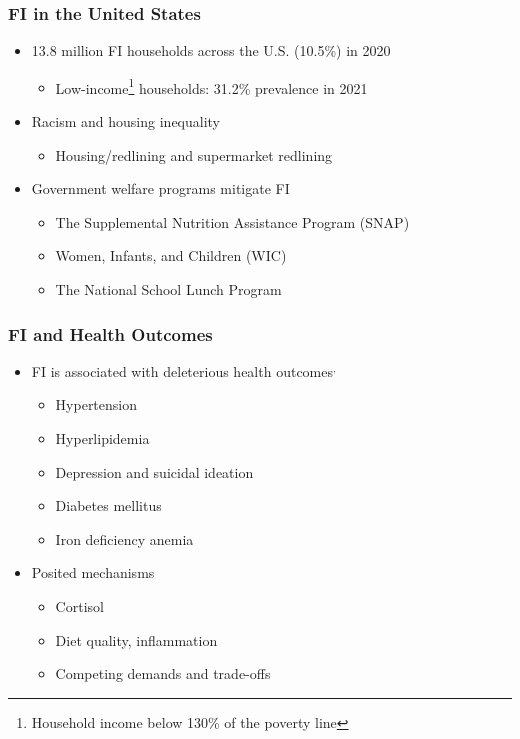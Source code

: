 \documentclass{beamer}
\begin{document}
\begin{frame}
	\frametitle{FI in the United States}
	\begin{itemize}
		\item 13.8 million FI households  across the U.S. (10.5\%) in 2020
		\begin{itemize}
			\item Low-income\footnote{Household income below 130\% of the poverty line}  households: 31.2\% prevalence in 2021
		\end{itemize}
		\item Racism and housing inequality
		\begin{itemize}
			\item Housing/redlining and supermarket redlining
		\end{itemize}       
		\item Government welfare programs mitigate FI     \begin{itemize}
			\item The Supplemental Nutrition Assistance Program (SNAP)
			\item Women, Infants, and Children (WIC)
			\item The National School Lunch Program
		\end{itemize}
	\end{itemize}
\end{frame}




\begin{frame}
	\frametitle{FI and Health Outcomes}
	
	\begin{itemize}
		\item FI is associated with deleterious health outcomes$^{,}$
		\begin{itemize}
			\item Hypertension
			\item Hyperlipidemia
			\item Depression and suicidal ideation
			\item Diabetes mellitus
			\item Iron deficiency anemia
		\end{itemize}
		
		\item Posited mechanisms
		\begin{itemize}
			\item Cortisol
			\item Diet quality, inflammation
			\item Competing demands and trade-offs
		\end{itemize}
	\end{itemize}
\end{frame}
\end{document}
